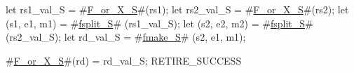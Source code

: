 let rs1_val_S    = #\hyperref[sailRISCVzFzyorzyXzyS]{F\_or\_X\_S}#(rs1);
let rs2_val_S    = #\hyperref[sailRISCVzFzyorzyXzyS]{F\_or\_X\_S}#(rs2);
let (s1, e1, m1) = #\hyperref[sailRISCVzfsplitzyS]{fsplit\_S}# (rs1_val_S);
let (s2, e2, m2) = #\hyperref[sailRISCVzfsplitzyS]{fsplit\_S}# (rs2_val_S);
let rd_val_S     = #\hyperref[sailRISCVzfmakezyS]{fmake\_S}# (s2, e1, m1);

#\hyperref[sailRISCVzFzyorzyXzyS]{F\_or\_X\_S}#(rd) = rd_val_S;
RETIRE_SUCCESS
